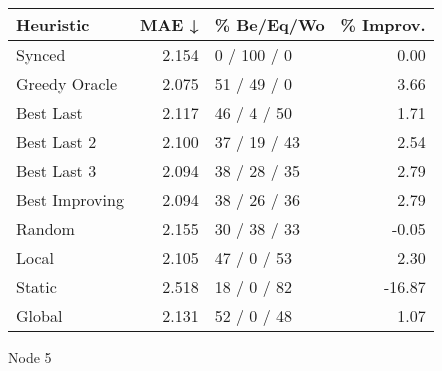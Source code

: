 \begin{tabular}{lrlr}
\toprule
\textbf{Heuristic} & \textbf{MAE ↓} & \textbf{\% Be/Eq/Wo} & \textbf{\% Improv.} \\
\midrule
            Synced &          2.154 &          0 / 100 / 0 &                0.00 \\
     Greedy Oracle &          2.075 &          51 / 49 / 0 &                3.66 \\
         Best Last &          2.117 &          46 / 4 / 50 &                1.71 \\
       Best Last 2 &          2.100 &         37 / 19 / 43 &                2.54 \\
       Best Last 3 &          2.094 &         38 / 28 / 35 &                2.79 \\
    Best Improving &          2.094 &         38 / 26 / 36 &                2.79 \\
            Random &          2.155 &         30 / 38 / 33 &               -0.05 \\
             Local &          2.105 &          47 / 0 / 53 &                2.30 \\
            Static &          2.518 &          18 / 0 / 82 &              -16.87 \\
            Global &          2.131 &          52 / 0 / 48 &                1.07 \\
\bottomrule
\end{tabular}
\caption{Node 5}
\label{tab:hr_non_lr01_le2_bs4_5}
